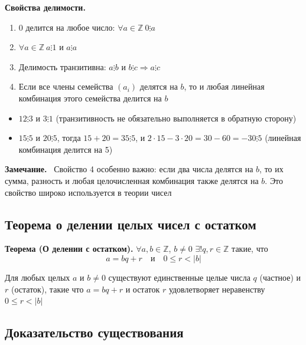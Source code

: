 \documentclass[a4paper,12pt]{article}
\newcommand{\myremark}{\textbf{Замечание.}\ }
\theoremstyle{definition}
\theoremstyle{plain}
\theoremstyle{remark}
\begin{document}
	\noindent \textbf{Свойства делимости.}
	
	\begin{enumerate}
		\item $0$ делится на любое число: $\forall a \in \mathbb{Z} \ 0 \vdots a$
		\item $\forall a \in \mathbb{Z} \ a \vdots 1$ и $a \vdots a$
		\item Делимость транзитивна: $a \vdots b$ и $b \vdots c \Rightarrow a \vdots c$
		\item Если все члены семейства $(a_i)$ делятся на $b$, то и любая линейная комбинация этого семейства делится на $b$
	\end{enumerate}
	
	\begin{tcolorbox}[colback=gray!5, colframe=gray!50, title=Примеры на свойства]
		\begin{itemize}
			\item $12 \vdots 3$ и $3 \vdots 1$ (транзитивность не обязательно выполняется в обратную сторону)
			\item $15 \vdots 5$ и $20 \vdots 5$, тогда $15+20=35 \vdots 5$, и $2\cdot 15 - 3\cdot 20 = 30-60 = -30 \vdots 5$ (линейная комбинация делится на 5)
		\end{itemize}
	\end{tcolorbox}
	
	\myremark
	Свойство 4 особенно важно: если два числа делятся на $b$, то их сумма, разность и любая целочисленная комбинация также делятся на $b$. Это свойство широко используется в теории чисел
	
	\subsection{Теорема о делении целых чисел с остатком}
	
	\noindent \textbf{Теорема (О делении с остатком).}
	$\forall a, b \in \mathbb{Z}$, $b \neq 0$ $\exists! q, r \in \mathbb{Z}$ такие, что
	\[
	a = bq + r \quad \text{и} \quad 0 \leq r < |b|
	\]
	
	\begin{tcolorbox}[colback=red!5, colframe=red!70!black, title=Формулировка]
		Для любых целых $a$ и $b \neq 0$ существуют единственные целые числа $q$ (частное) и $r$ (остаток), такие что $a = bq + r$ и остаток $r$ удовлетворяет неравенству $0 \leq r < |b|$
	\end{tcolorbox}
	
	\subsection{Доказательство существования}
	
\end{document}

